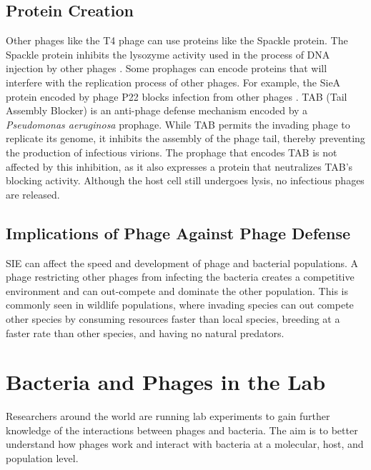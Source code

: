 \subsection{Protein Creation}
Other phages like the T4 phage can use proteins like the Spackle protein. 
The Spackle protein inhibits the lysozyme activity used in the process of DNA injection by other phages \cite{bucherPhageMachineSIEence2024, kanamaruStructureFunctionT42020}. 
Some prophages can encode proteins that will interfere with the replication process of other phages. 
For example, the SieA protein encoded by phage P22 blocks infection from other phages \cite{leavittBacteriophageP22SieAmediated2024}. \newline
TAB (Tail Assembly Blocker) is an anti-phage defense mechanism encoded by a \textit{Pseudomonas aeruginosa} prophage. 
While TAB permits the invading phage to replicate its genome, it inhibits the assembly of the phage tail, thereby preventing the production of infectious virions. 
The prophage that encodes TAB is not affected by this inhibition, as it also expresses a protein that neutralizes TAB's blocking activity. 
Although the host cell still undergoes lysis, no infectious phages are released.

\subsection{Implications of Phage Against Phage Defense}
SIE can affect the speed and development of phage and bacterial populations. A phage restricting other phages from infecting the bacteria creates a competitive environment and can out-compete and dominate the other population. 
This is commonly seen in wildlife populations, where invading species can out compete other species by consuming resources faster than local species, breeding at a faster rate than other species, and having no natural predators. 

\section{Bacteria and Phages in the Lab}
Researchers around the world are running lab experiments to gain further knowledge of the interactions between phages and bacteria. 
The aim is to better understand how phages work and interact with bacteria at a molecular, host, and population level. 

